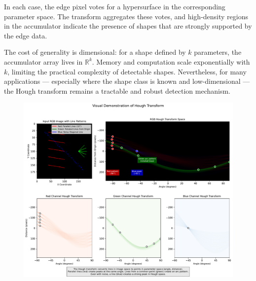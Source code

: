 In each case, the edge pixel votes for a hypersurface in the corresponding parameter space. The transform aggregates these votes, and high-density regions in the accumulator indicate the presence of shapes that are strongly supported by the edge data.

The cost of generality is dimensional: for a shape defined by $k$ parameters, the accumulator array lives in $\mathbb{R}^k$. Memory and computation scale exponentially with $k$, limiting the practical complexity of detectable shapes. Nevertheless, for many applications — especially where the shape class is known and low-dimensional — the Hough transform remains a tractable and robust detection mechanism.

\begin{figure}[ht]
  \centering
  \includegraphics[width=1\textwidth]{41_HoughTransfrom/hough_transform_visualization.pdf}
  \label{fig:permgraph3}
\end{figure}
